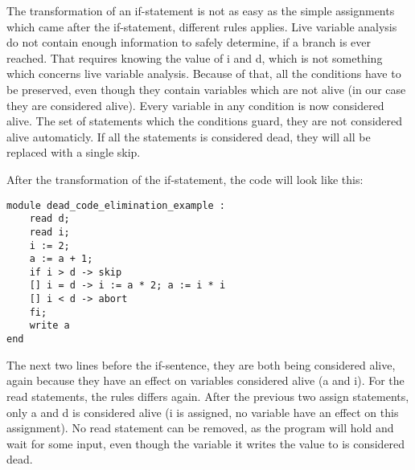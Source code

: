The transformation of an if-statement is not as easy as the simple assignments which came after the if-statement, different rules applies. Live variable analysis do not contain enough information to safely determine, if a branch is ever reached. That requires knowing the value of i and d, which is not something which concerns live variable analysis. Because of that, all the conditions have to be preserved, even though they contain variables which are not alive (in our case they are considered alive). Every variable in any condition is now considered alive. The set of statements which the conditions guard, they are not considered alive automaticly. If all the statements is considered dead, they will all be replaced with a single skip.

After the transformation of the if-statement, the code will look like this:
\begin{lstlisting}
module dead_code_elimination_example :
	read d;
	read i;
	i := 2;
	a := a + 1;
	if i > d -> skip
	[] i = d -> i := a * 2; a := i * i
	[] i < d -> abort
	fi;
	write a
end
\end{lstlisting}
The next two lines before the if-sentence, they are both being considered alive, again because they have an effect on variables considered alive (a and i). For the read statements, the rules differs again. After the previous two assign statements, only a and d is considered alive (i is assigned, no variable have an effect on this assignment). No read statement can be removed, as the program will hold and wait for some input, even though the variable it writes the value to is considered dead.
